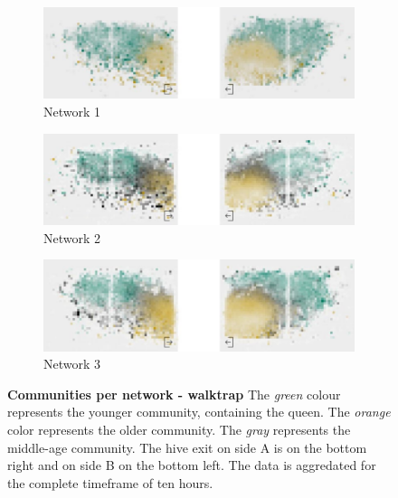 \begin{figure}[htb]
	\centering
	\begin{subfigure}[b]{1.0\textwidth}
		\centering
		\includegraphics[width=\textwidth]{Figures/wt_network1}
		\caption[Network 1]{Network 1}
		\label{fig:wt1}
		\vspace*{5mm}
	\end{subfigure}
	\begin{subfigure}[b]{1.0\textwidth}
		\includegraphics[width=\textwidth]{Figures/wt_network2}
		\caption[Network 2]{Network 2}
		\label{fig:wt2}
		\vspace*{5mm}
	\end{subfigure}
	\begin{subfigure}[b]{1.0\textwidth}
		\includegraphics[width=\textwidth]{Figures/wt_network3}
		\caption[Network 3]{Network 3}
		\label{fig:wt3}
		\vspace*{5mm}
	\end{subfigure}
	\caption[Communities per network - walktrap]{\textbf{Communities per network - walktrap} The \emph{green} colour represents the younger community, containing the queen. The \emph{orange} color represents the older community. The \emph{gray} represents the middle-age community. The hive exit on side A is on the bottom right and on side B on the bottom left. The data is aggredated for the complete timeframe of ten hours.}
	\label{fig:communitiesPerNetworkWT}
\end{figure}

